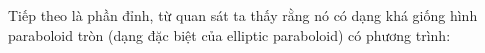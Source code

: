 \documentclass[preview]{standalone}
\begin{document}
\begin{center}
Tiếp theo là phần đỉnh, từ quan sát ta thấy rằng nó có dạng khá giống hình paraboloid tròn (dạng đặc biệt của elliptic paraboloid) có phương trình:
\end{center}
\end{document}
